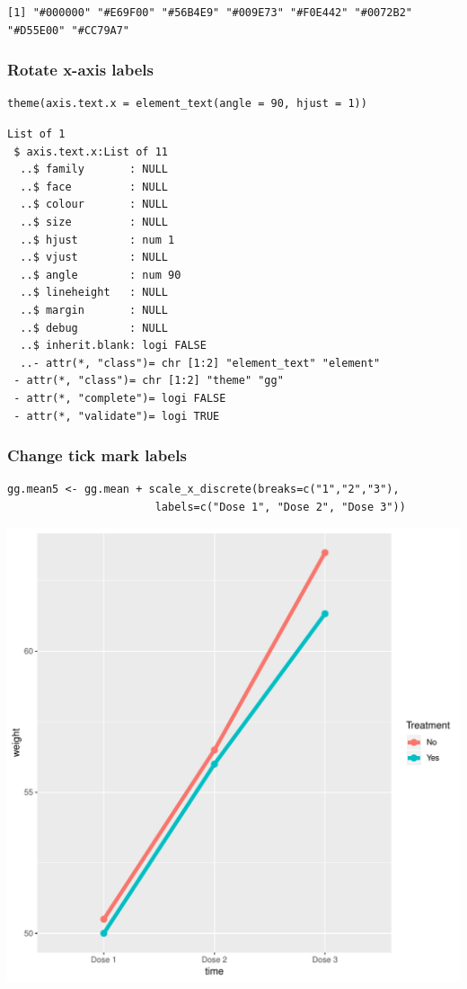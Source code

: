 \documentclass{article}
\begin{document}
\begin{verbatim}
[1] "#000000" "#E69F00" "#56B4E9" "#009E73" "#F0E442" "#0072B2" "#D55E00" "#CC79A7"
\end{verbatim}

\subsubsection{Rotate x-axis labels}
\label{sec:orgc7ab3b2}
\lstset{language=r,label= ,caption= ,captionpos=b,numbers=none}
\begin{lstlisting}
theme(axis.text.x = element_text(angle = 90, hjust = 1))
\end{lstlisting}

\begin{verbatim}
List of 1
 $ axis.text.x:List of 11
  ..$ family       : NULL
  ..$ face         : NULL
  ..$ colour       : NULL
  ..$ size         : NULL
  ..$ hjust        : num 1
  ..$ vjust        : NULL
  ..$ angle        : num 90
  ..$ lineheight   : NULL
  ..$ margin       : NULL
  ..$ debug        : NULL
  ..$ inherit.blank: logi FALSE
  ..- attr(*, "class")= chr [1:2] "element_text" "element"
 - attr(*, "class")= chr [1:2] "theme" "gg"
 - attr(*, "complete")= logi FALSE
 - attr(*, "validate")= logi TRUE
\end{verbatim}

\subsubsection{Change tick mark labels}
\label{sec:org6d59905}

\lstset{language=r,label= ,caption= ,captionpos=b,numbers=none}
\begin{lstlisting}
gg.mean5 <- gg.mean + scale_x_discrete(breaks=c("1","2","3"),
				       labels=c("Dose 1", "Dose 2", "Dose 3"))
\end{lstlisting}

\begin{center}
\includegraphics[width=.9\linewidth]{./figures/fig-meanTime5.pdf}
\end{center}
\end{document}
